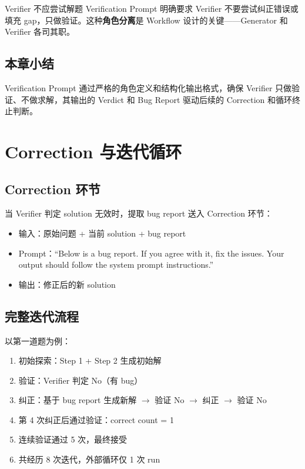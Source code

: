 \documentclass[a4paper]{article}
\begin{document}
\begin{warningbox}{Verifier 不应尝试解题}
Verification Prompt 明确要求 Verifier 不要尝试纠正错误或填充 gap，只做验证。这种\textbf{角色分离}是 Workflow 设计的关键——Generator 和 Verifier 各司其职。
\end{warningbox}

\subsection{本章小结}

Verification Prompt 通过严格的角色定义和结构化输出格式，确保 Verifier 只做验证、不做求解，其输出的 Verdict 和 Bug Report 驱动后续的 Correction 和循环终止判断。

\section{Correction 与迭代循环}

\subsection{Correction 环节}

当 Verifier 判定 solution 无效时，提取 bug report 送入 Correction 环节：
\begin{itemize}
    \item 输入：原始问题 + 当前 solution + bug report
    \item Prompt：``Below is a bug report. If you agree with it, fix the issues. Your output should follow the system prompt instructions.''
    \item 输出：修正后的新 solution
\end{itemize}

\subsection{完整迭代流程}

以第一道题为例：
\begin{enumerate}
    \item 初始探索：Step 1 + Step 2 生成初始解
    \item 验证：Verifier 判定 No（有 bug）
    \item 纠正：基于 bug report 生成新解 $\rightarrow$ 验证 No $\rightarrow$ 纠正 $\rightarrow$ 验证 No
    \item 第 4 次纠正后通过验证：correct count = 1
    \item 连续验证通过 5 次，最终接受
    \item 共经历 8 次迭代，外部循环仅 1 次 run
\end{enumerate}
\end{document}
